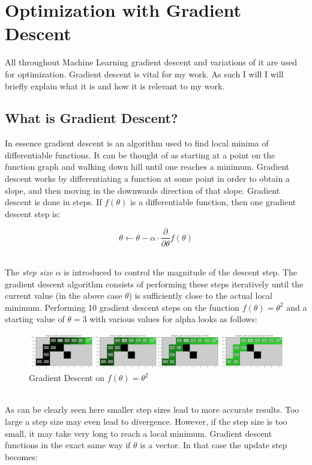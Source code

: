 \chapter{Optimization with Gradient Descent}\label{gd}
All throughout Machine Learning gradient descent and variations of it are used for optimization. Gradient descent is vital for my work. As such I will I will briefly explain what it is and how it is relevant to my work.

\section{What is Gradient Descent?}\label{gd:what_is_it}
In essence gradient descent is an algorithm used to find local minima of differentiable functions. It can be thought of as starting at a point on the function graph and walking down hill until one reaches a minimum. Gradient descent works by differentiating a function at some point in order to obtain a slope, and then moving in the downwards direction of that slope. Gradient descent is done in steps. If $f(\theta)$ is a differentiable function, then one gradient descent step is:

\begin{equation}\label{Graident_Descent:basic_update}
    \theta \leftarrow \theta - \alpha \cdot \frac{\partial}{\partial \theta}f(\theta)
\end{equation}

\noindent
\\ The \textit{step size} $\alpha$ is introduced to control the magnitude of the descent step. The gradient descent algorithm consists of performing these steps iteratively until the current value (in the above case $\theta$) is sufficiently close to the actual local minimum. Performing 10 gradient descent steps on the function $f(\theta) = \theta^2$ and a starting value of $\theta = 3$ with various values for alpha looks as follows:

\begin{figure}[ht]
    \centering
    \includegraphics[width=\linewidth]{figures/grid_world_discount_factors.png}
    \caption{Gradient Descent on $f(\theta) = \theta^2$}
    \label{fig:UNO}
\end{figure}

\noindent
\\ As can be clearly seen here smaller step sizes lead to more accurate results. Too large a step size may even lead to divergence. However, if the step size is too small, it may take very long to reach a local minimum. Gradient descent functions in the exact same way if $\theta$ is a vector. In that case the update step becomes:

